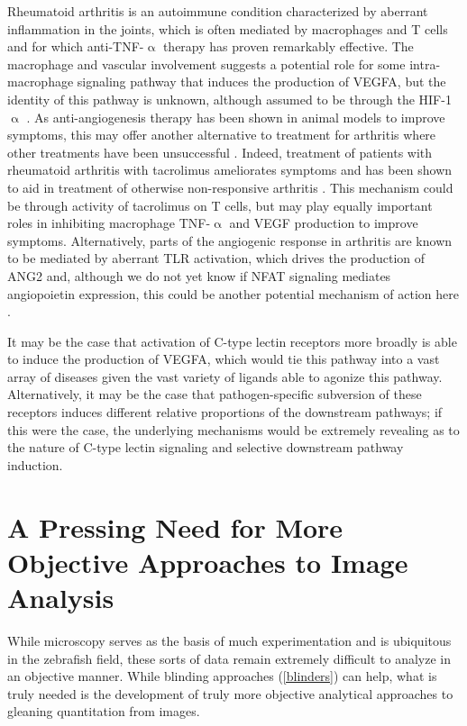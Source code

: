 Rheumatoid arthritis is an autoimmune condition characterized by aberrant inflammation in the joints, which is often mediated by macrophages and T cells and for which anti-TNF-$\upalpha$ therapy has proven remarkably effective. The macrophage and vascular involvement suggests a potential role for some intra-macrophage signaling pathway that induces the production of VEGFA, but the identity of this pathway is unknown, although assumed to be through the HIF-1$\upalpha$ \citep{MacDonald2018}. As anti-angiogenesis therapy has been shown in animal models to improve symptoms, this may offer another alternative to treatment for arthritis where other treatments have been unsuccessful \citep{Paleolog2002, Elshabrawy2015}. Indeed, treatment of patients with rheumatoid arthritis with tacrolimus ameliorates symptoms and has been shown to aid in treatment of otherwise non-responsive arthritis \citep{Dutta2011}. This mechanism could be through activity of tacrolimus on T cells, but may play equally important roles in inhibiting macrophage TNF-$\upalpha$ and VEGF production to improve symptoms. Alternatively, parts of the angiogenic response in arthritis are known to be mediated by aberrant TLR activation, which drives the production of ANG2 and, although we do not yet know if NFAT signaling mediates angiopoietin expression, this could be another potential mechanism of action here \citep{Saber2011}.

It may be the case that activation of C-type lectin receptors more broadly is able to induce the production of VEGFA, which would tie this pathway into a vast array of diseases given the vast variety of ligands able to agonize this pathway. Alternatively, it may be the case that pathogen-specific subversion of these receptors induces different relative proportions of the downstream pathways; if this were the case, the underlying mechanisms would be extremely revealing as to the nature of C-type lectin signaling and selective downstream pathway induction. 

\section{A Pressing Need for More Objective Approaches to Image Analysis}

While microscopy serves as the basis of much experimentation and is ubiquitous in the zebrafish field, these sorts of data remain extremely difficult to analyze in an objective manner. While blinding approaches (\autoref{blinders}) can help, what is truly needed is the development of truly more objective analytical approaches to gleaning quantitation from images. 

